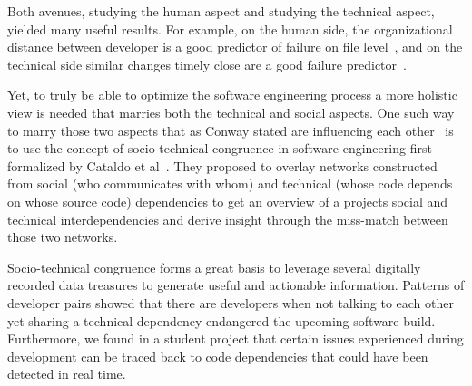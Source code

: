 Both avenues, studying the human aspect and studying the technical aspect, yielded many useful results.
For example, on the human side, the organizational distance between developer is a good predictor of failure on file level~\cite{nagappan:icse:2008}, and on the technical side similar changes timely close are a good failure predictor~\cite{kim:icse:2007}.

Yet, to truly be able to optimize the software engineering process a more holistic view is needed that marries both the technical and social aspects.
One such way to marry those two aspects that as Conway stated are influencing each other~\cite{conway:datamination:1968} is to use the concept of socio-technical congruence in software engineering first formalized by Cataldo et al~\cite{cataldo:cscw:2006}.
They proposed to overlay networks constructed from social (who communicates with whom) and technical (whose code depends on whose source code) dependencies to get an overview of a projects social and technical interdependencies and derive insight through the miss-match between those two networks.



Socio-technical congruence forms a great basis to leverage several digitally recorded data treasures to generate useful and actionable information.
Patterns of developer pairs showed that there are developers when not talking to each other yet sharing a technical dependency endangered the upcoming software build.
Furthermore, we found in a student project that certain issues experienced during development can be traced back to code dependencies that could have been detected in real time.

